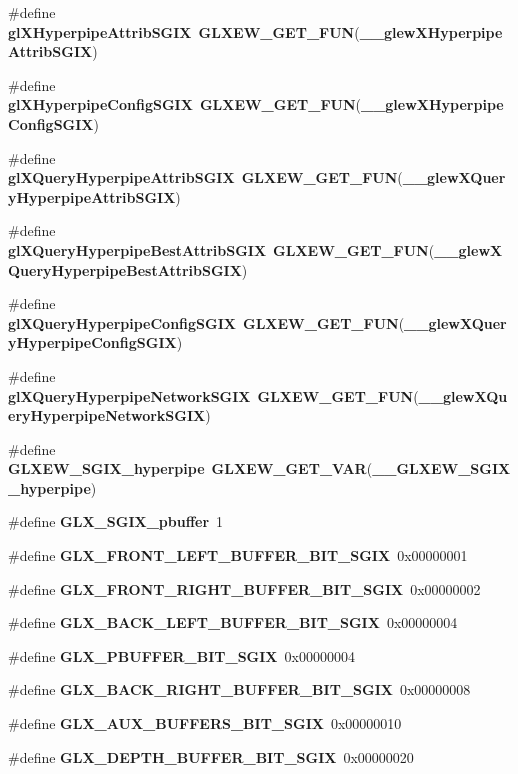\begin{DoxyCompactItemize}
\#define {\bf gl\+X\+Hyperpipe\+Attrib\+S\+G\+IX}~{\bf G\+L\+X\+E\+W\+\_\+\+G\+E\+T\+\_\+\+F\+UN}({\bf \+\_\+\+\_\+glew\+X\+Hyperpipe\+Attrib\+S\+G\+IX})
\item 
\#define {\bf gl\+X\+Hyperpipe\+Config\+S\+G\+IX}~{\bf G\+L\+X\+E\+W\+\_\+\+G\+E\+T\+\_\+\+F\+UN}({\bf \+\_\+\+\_\+glew\+X\+Hyperpipe\+Config\+S\+G\+IX})
\item 
\#define {\bf gl\+X\+Query\+Hyperpipe\+Attrib\+S\+G\+IX}~{\bf G\+L\+X\+E\+W\+\_\+\+G\+E\+T\+\_\+\+F\+UN}({\bf \+\_\+\+\_\+glew\+X\+Query\+Hyperpipe\+Attrib\+S\+G\+IX})
\item 
\#define {\bf gl\+X\+Query\+Hyperpipe\+Best\+Attrib\+S\+G\+IX}~{\bf G\+L\+X\+E\+W\+\_\+\+G\+E\+T\+\_\+\+F\+UN}({\bf \+\_\+\+\_\+glew\+X\+Query\+Hyperpipe\+Best\+Attrib\+S\+G\+IX})
\item 
\#define {\bf gl\+X\+Query\+Hyperpipe\+Config\+S\+G\+IX}~{\bf G\+L\+X\+E\+W\+\_\+\+G\+E\+T\+\_\+\+F\+UN}({\bf \+\_\+\+\_\+glew\+X\+Query\+Hyperpipe\+Config\+S\+G\+IX})
\item 
\#define {\bf gl\+X\+Query\+Hyperpipe\+Network\+S\+G\+IX}~{\bf G\+L\+X\+E\+W\+\_\+\+G\+E\+T\+\_\+\+F\+UN}({\bf \+\_\+\+\_\+glew\+X\+Query\+Hyperpipe\+Network\+S\+G\+IX})
\item 
\#define {\bf G\+L\+X\+E\+W\+\_\+\+S\+G\+I\+X\+\_\+hyperpipe}~{\bf G\+L\+X\+E\+W\+\_\+\+G\+E\+T\+\_\+\+V\+AR}({\bf \+\_\+\+\_\+\+G\+L\+X\+E\+W\+\_\+\+S\+G\+I\+X\+\_\+hyperpipe})
\item 
\#define {\bf G\+L\+X\+\_\+\+S\+G\+I\+X\+\_\+pbuffer}~1
\item 
\#define {\bf G\+L\+X\+\_\+\+F\+R\+O\+N\+T\+\_\+\+L\+E\+F\+T\+\_\+\+B\+U\+F\+F\+E\+R\+\_\+\+B\+I\+T\+\_\+\+S\+G\+IX}~0x00000001
\item 
\#define {\bf G\+L\+X\+\_\+\+F\+R\+O\+N\+T\+\_\+\+R\+I\+G\+H\+T\+\_\+\+B\+U\+F\+F\+E\+R\+\_\+\+B\+I\+T\+\_\+\+S\+G\+IX}~0x00000002
\item 
\#define {\bf G\+L\+X\+\_\+\+B\+A\+C\+K\+\_\+\+L\+E\+F\+T\+\_\+\+B\+U\+F\+F\+E\+R\+\_\+\+B\+I\+T\+\_\+\+S\+G\+IX}~0x00000004
\item 
\#define {\bf G\+L\+X\+\_\+\+P\+B\+U\+F\+F\+E\+R\+\_\+\+B\+I\+T\+\_\+\+S\+G\+IX}~0x00000004
\item 
\#define {\bf G\+L\+X\+\_\+\+B\+A\+C\+K\+\_\+\+R\+I\+G\+H\+T\+\_\+\+B\+U\+F\+F\+E\+R\+\_\+\+B\+I\+T\+\_\+\+S\+G\+IX}~0x00000008
\item 
\#define {\bf G\+L\+X\+\_\+\+A\+U\+X\+\_\+\+B\+U\+F\+F\+E\+R\+S\+\_\+\+B\+I\+T\+\_\+\+S\+G\+IX}~0x00000010
\item 
\#define {\bf G\+L\+X\+\_\+\+D\+E\+P\+T\+H\+\_\+\+B\+U\+F\+F\+E\+R\+\_\+\+B\+I\+T\+\_\+\+S\+G\+IX}~0x00000020

\end{DoxyCompactItemize}
